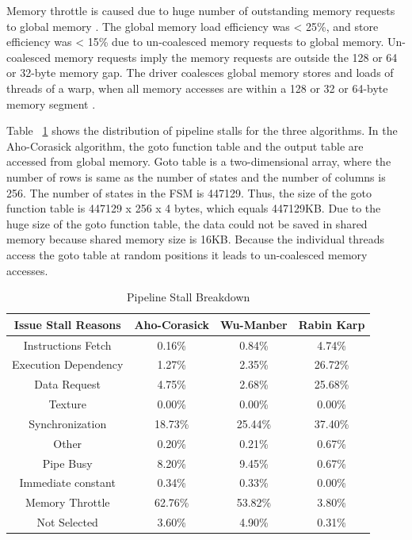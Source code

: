 Memory throttle is caused due to huge number of outstanding memory requests to global memory \cite{bib5}. The global memory load efficiency was < 25\%, and store efficiency was < 15\% due to un-coalesced memory requests to global memory. Un-coalesced memory requests imply the memory requests are outside the 128 or 64 or 32-byte memory gap. The driver coalesces global memory stores and loads of threads of a warp, when all memory accesses are within a 128 or 32 or 64-byte memory segment \cite{bib15}.

Table ~\ref{tab:shift} shows the distribution of pipeline stalls for the three algorithms. In the Aho-Corasick algorithm, the goto function table and the output table are accessed from global memory. Goto table is a two-dimensional array, where the number of rows is same as the number of states and the number of columns is 256. The number of states in the FSM is 447129. Thus, the size of the goto function table is 447129 x 256 x 4 bytes, which equals 447129KB. Due to the huge size of the goto function table, the data could not be saved in shared memory because shared memory size is 16KB. Because the individual threads access the goto table at random positions it leads to un-coalesced memory accesses. 

\begin {table}[H]
\centering
\caption {Pipeline Stall Breakdown} \label{tab:shift}
\begin{tabular}{|c|c|c|c|}
	\midrule
	Issue Stall Reasons &    Aho-Corasick &    Wu-Manber &    Rabin Karp\\
	\midrule
	Instructions Fetch & 0.16\%    & 0.84\%     & 4.74\%\\
	\midrule
	Execution Dependency &    1.27\% &    2.35\% &    26.72\%\\
	\midrule
	Data Request &    4.75\%    & 2.68\% &    25.68\%\\
	\midrule
	Texture     &    0.00\%    & 0.00\%    & 0.00\%\\
	\midrule
	Synchronization &    18.73\%     & 25.44\%    & 37.40\%\\
	\midrule
	Other &    0.20\%    & 0.21\%    & 0.67\%\\
	\midrule
	Pipe Busy &    8.20\%    & 9.45\%    & 0.67\%\\
	\midrule
	Immediate constant    & 0.34\%    & 0.33\%    & 0.00\%\\
	\midrule
	Memory Throttle    & 62.76\%    & 53.82\%    & 3.80\%\\
	\midrule
	Not Selected &    3.60\%    & 4.90\%    & 0.31\%\\
	\midrule
\end{tabular}
\end{table}
\squeezeup

